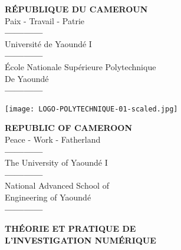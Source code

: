 \documentclass[12pt,a4paper]{article}
\begin{document}
\thispagestyle{empty} %

\begin{center}
  \begin{minipage}{0.35\linewidth}
    \centering
    \textbf{RÉPUBLIQUE DU CAMEROUN} \\ 
    Paix - Travail - Patrie \\[1em]
    \textbf{------------} \\[1em]
    Université de Yaoundé I \\[1em]
    \textbf{------------} \\[1em]
    École Nationale Supérieure Polytechnique \\[1em]
    De Yaoundé \\[1em]
    \textbf{------------} \\
  \end{minipage}
  \hfill
  \begin{minipage}{0.25\linewidth}
    \centering
    \texttt{[image: LOGO-POLYTECHNIQUE-01-scaled.jpg]}
  \end{minipage}
  \hfill
  \begin{minipage}{0.35\linewidth}
    \centering
    \textbf{REPUBLIC OF CAMEROON} \\ 
    Peace - Work - Fatherland \\[1em]
    \textbf{------------} \\[1em]
    The University of Yaoundé I \\[1em]
    \textbf{------------} \\[1em]
    National Advanced School of \\[1em]
    Engineering of Yaoundé \\[1em]
    \textbf{------------} \\
  \end{minipage}
\end{center}

\vspace{3cm}

\begin{center}
  {\Huge \textbf{THÉORIE ET PRATIQUE DE \\[0.5em] L’INVESTIGATION NUMÉRIQUE}}
\end{center}

\vspace{3cm}
\end{document}
